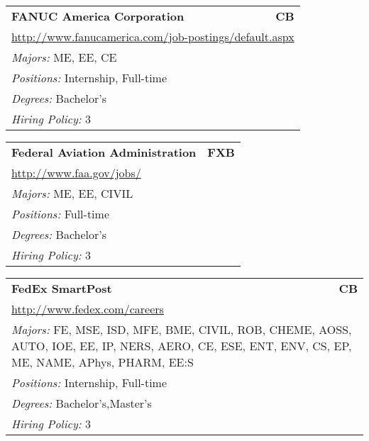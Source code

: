 \documentclass[twoside]{article}
\begin{document}
\begin{center}
\begin{multicols}{3}
\begin{FlushLeft}
\begin{minipage}{.9\columnwidth}\begin{tabularx}{.95\columnwidth}{Xr}
                 {\Large\bf FANUC America Corporation} & {\Large\bf CB}\\
    \multicolumn{2}{p{.95\columnwidth}}{\url{http://www.fanucamerica.com/job-postings/default.aspx}}\\
    \multicolumn{2}{p{.95\columnwidth}}{\emph{Majors:} ME, EE, CE}\\
    \multicolumn{2}{p{.95\columnwidth}}{\emph{Positions:} Internship, Full-time}\\
    \multicolumn{2}{p{.95\columnwidth}}{\emph{Degrees:} Bachelor's}\\
    \multicolumn{2}{p{.95\columnwidth}}{\emph{Hiring Policy:} 3}\\
    \end{tabularx}
    
\end{minipage}
 
\begin{minipage}{.9\columnwidth}\begin{tabularx}{.95\columnwidth}{Xr}
                 {\Large\bf Federal Aviation Administration} & {\Large\bf FXB}\\
    \multicolumn{2}{p{.95\columnwidth}}{\url{http://www.faa.gov/jobs/}}\\
    \multicolumn{2}{p{.95\columnwidth}}{\emph{Majors:} ME, EE, CIVIL}\\
    \multicolumn{2}{p{.95\columnwidth}}{\emph{Positions:} Full-time}\\
    \multicolumn{2}{p{.95\columnwidth}}{\emph{Degrees:} Bachelor's}\\
    \multicolumn{2}{p{.95\columnwidth}}{\emph{Hiring Policy:} 3}\\
    \end{tabularx}
    
\end{minipage}
 
\begin{minipage}{.9\columnwidth}\begin{tabularx}{.95\columnwidth}{Xr}
                 {\Large\bf FedEx SmartPost} & {\Large\bf CB}\\
    \multicolumn{2}{p{.95\columnwidth}}{\url{http://www.fedex.com/careers}}\\
    \multicolumn{2}{p{.95\columnwidth}}{\emph{Majors:} FE, MSE, ISD, MFE, BME, CIVIL, ROB, CHEME, AOSS, AUTO, IOE, EE, IP, NERS, AERO, CE, ESE, ENT, ENV, CS, EP, ME, NAME, APhys, PHARM, EE:S}\\
    \multicolumn{2}{p{.95\columnwidth}}{\emph{Positions:} Internship, Full-time}\\
    \multicolumn{2}{p{.95\columnwidth}}{\emph{Degrees:} Bachelor's,Master's}\\
    \multicolumn{2}{p{.95\columnwidth}}{\emph{Hiring Policy:} 3}\\
    \end{tabularx}
    

\end{minipage}
\end{FlushLeft}
\end{multicols}
\end{center}
\end{document}
